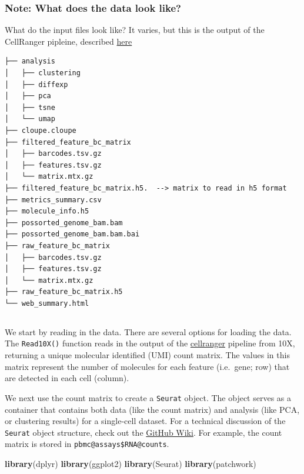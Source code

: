 \documentclass[
]{book}
\newenvironment{Shaded}{\begin{snugshade}}{\end{snugshade}}
\newcommand{\FunctionTok}[1]{\textcolor[rgb]{0.13,0.29,0.53}{\textbf{#1}}}
\newcommand{\NormalTok}[1]{#1}
\begin{document}
\subsubsection*{Note: What does the data look like?}\label{note-what-does-the-data-look-like}

What do the input files look like? It varies, but this is the output of the CellRanger pipleine, described \href{https://support.10xgenomics.com/single-cell-gene-expression/software/pipelines/latest/output/gex-outputs}{here}

\begin{verbatim}
├── analysis
│   ├── clustering
│   ├── diffexp
│   ├── pca
│   ├── tsne
│   └── umap
├── cloupe.cloupe
├── filtered_feature_bc_matrix
│   ├── barcodes.tsv.gz
│   ├── features.tsv.gz
│   └── matrix.mtx.gz
├── filtered_feature_bc_matrix.h5.  --> matrix to read in h5 format
├── metrics_summary.csv
├── molecule_info.h5
├── possorted_genome_bam.bam
├── possorted_genome_bam.bam.bai
├── raw_feature_bc_matrix
│   ├── barcodes.tsv.gz
│   ├── features.tsv.gz
│   └── matrix.mtx.gz
├── raw_feature_bc_matrix.h5 
└── web_summary.html
\end{verbatim}

\subsection*{}\label{section}

We start by reading in the data. There are several options for loading the data. The \texttt{Read10X()} function reads in the output of the \href{https://support.10xgenomics.com/single-cell-gene-expression/software/pipelines/latest/what-is-cell-ranger}{cellranger} pipeline from 10X, returning a unique molecular identified (UMI) count matrix. The values in this matrix represent the number of molecules for each feature (i.e.~gene; row) that are detected in each cell (column).

We next use the count matrix to create a \texttt{Seurat} object. The object serves as a container that contains both data (like the count matrix) and analysis (like PCA, or clustering results) for a single-cell dataset. For a technical discussion of the \texttt{Seurat} object structure, check out the \href{https://github.com/satijalab/seurat/wiki}{GitHub Wiki}. For example, the count matrix is stored in \texttt{pbmc@assays\$RNA@counts}.

\begin{Shaded}
\begin{Highlighting}[]
\FunctionTok{library}\NormalTok{(dplyr)}
\FunctionTok{library}\NormalTok{(ggplot2)}
\FunctionTok{library}\NormalTok{(Seurat)}
\FunctionTok{library}\NormalTok{(patchwork)}
\end{Highlighting}
\end{Shaded}
\end{document}
